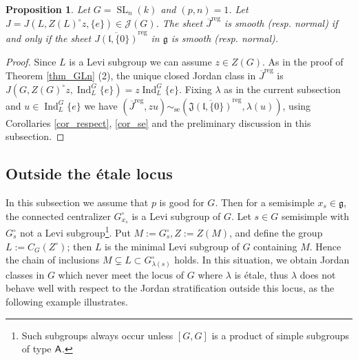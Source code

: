 \documentclass[12pt]{amsart}
\newtheorem{Proposition}[Theorem]{Proposition}
\theoremstyle{definition}
\theoremstyle{remark}
\newcommand{\g}{\mathfrak{g}}
\renewcommand{\l}{\mathfrak{l}}
\newcommand{\J}{\mathfrak{J}}
\newcommand{\reg}{{\operatorname{reg}}}
\newcommand{\Ind}{\operatorname{Ind}}
\newcommand{\SL}{\operatorname{SL}}
\newcommand{\se}{\operatorname{se}}
\begin{document}
\begin{Proposition} \label{prop_sln}
Let $G = \SL_n(k)$ and $(p,n) =1$.
Let $J = J(L, Z(L)^\circ z, \{e\}) \in \mathcal{J}(G)$.
The sheet $\overline{J}^\reg$ is smooth (resp. normal) if and only if the  sheet $\overline{J(\l, \{0\})}^\reg$ in $\g$ is smooth (resp. normal).
\end{Proposition}
\begin{proof}
Since $L$ is a Levi subgroup we can assume $z \in Z(G)$.
As in the proof of Theorem \ref{thm_GLn} (2), the unique closed Jordan class in $\overline{J}^\reg$ is $J(G, Z(G)^\circ z, \Ind_L^G \{e\}) = z \Ind_L^G \{e\}$.
Fixing $\lambda$ as in the current subsection and $u \in \Ind_L^G \{e\}$ we have $(\overline{J}^\reg, zu) \sim_{\se} (\overline{\J (\l, \{0 \})}^\reg, \lambda(u))$, using Corollaries \ref{cor_respect}, \ref{cor_se} and the preliminary discussion in this subsection.
\end{proof}

\subsection{Outside the \'etale locus} \label{sub_outside}
In this subsection we assume that $p$ is good for $G$. Then for a semisimple $x_s \in \g$, the connected centralizer $G_{x_s}^\circ$ is a Levi subgroup of $G$.
Let $s \in G$ semisimple with $G_s^\circ$ not a Levi subgroup\footnote{Such subgroups always occur unless $[G,G]$ is a product of simple subgroups of type $\sf A$.}.
Put $M := G_s^\circ, Z := Z(M)$, and define the group $L := C_G(Z^\circ)$; then $L$ is the minimal Levi subgroup of $G$ containing $M$.
Hence the chain of inclusions $M \subsetneq L \subset  G_{\lambda(s)}^\circ$ holds.
In this situation, we obtain Jordan classes in $G$ which never meet the locus of $G$ where $\lambda$ is \'etale, thus $\lambda$ does not behave well with respect to the Jordan stratification outside this locus, as the following example illustrates.
\end{document}
